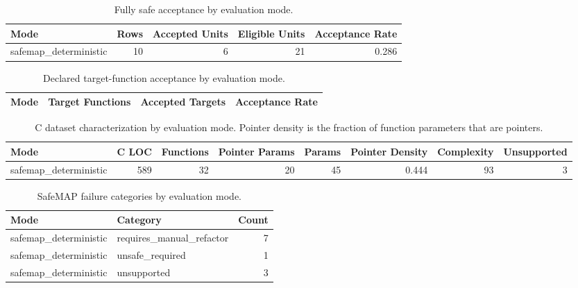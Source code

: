 \begin{table}[t]
\centering
\caption{Fully safe acceptance by evaluation mode.}
\label{tab:safemap-mode-summary}
\begin{tabular}{lrrrr}
\hline
Mode & Rows & Accepted Units & Eligible Units & Acceptance Rate \\
\hline
safemap\_deterministic & 10 & 6 & 21 & 0.286 \\
\hline
\end{tabular}
\end{table}

\begin{table}[t]
\centering
\caption{Declared target-function acceptance by evaluation mode.}
\label{tab:safemap-target-summary}
\begin{tabular}{lrrr}
\hline
Mode & Target Functions & Accepted Targets & Acceptance Rate \\
\hline
\hline
\end{tabular}
\end{table}

\begin{table}[t]
\centering
\caption{C dataset characterization by evaluation mode. Pointer density is the fraction of function parameters that are pointers.}
\label{tab:safemap-dataset-characterization}
\begin{tabular}{lrrrrrrr}
\hline
Mode & C LOC & Functions & Pointer Params & Params & Pointer Density & Complexity & Unsupported \\
\hline
safemap\_deterministic & 589 & 32 & 20 & 45 & 0.444 & 93 & 3 \\
\hline
\end{tabular}
\end{table}

\begin{table}[t]
\centering
\caption{SafeMAP failure categories by evaluation mode.}
\label{tab:safemap-failure-summary}
\begin{tabular}{llr}
\hline
Mode & Category & Count \\
\hline
safemap\_deterministic & requires\_manual\_refactor & 7 \\
safemap\_deterministic & unsafe\_required & 1 \\
safemap\_deterministic & unsupported & 3 \\
\hline
\end{tabular}
\end{table}

